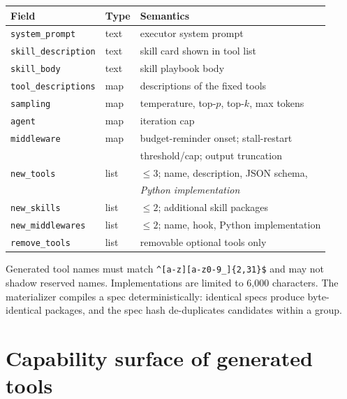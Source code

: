 \begin{center}
\small
\begin{tabular}{lll}
\toprule
Field & Type & Semantics \\
\midrule
\texttt{system\_prompt}      & text & executor system prompt \\
\texttt{skill\_description}  & text & skill card shown in tool list \\
\texttt{skill\_body}         & text & skill playbook body \\
\texttt{tool\_descriptions}  & map  & descriptions of the fixed tools \\
\texttt{sampling}            & map  & temperature, top-$p$, top-$k$, max tokens \\
\texttt{agent}               & map  & iteration cap \\
\texttt{middleware}          & map  & budget-reminder onset; stall-restart \\
                             &      & threshold/cap; output truncation \\
\midrule
\texttt{new\_tools}          & list & $\le 3$; name, description, JSON schema, \\
                             &      & \emph{Python implementation} \\
\texttt{new\_skills}         & list & $\le 2$; additional skill packages \\
\texttt{new\_middlewares}   & list & $\le 2$; name, hook, Python implementation \\
\texttt{remove\_tools}       & list & removable optional tools only \\
\bottomrule
\end{tabular}
\end{center}

Generated tool names must match \verb|^[a-z][a-z0-9_]{2,31}$| and may not
shadow reserved names.  Implementations are limited to 6{,}000 characters.
The materializer compiles a spec deterministically: identical specs produce
byte-identical packages, and the spec hash de-duplicates candidates within a
group.

\section{Capability surface of generated tools}
\label{app:sdk}


